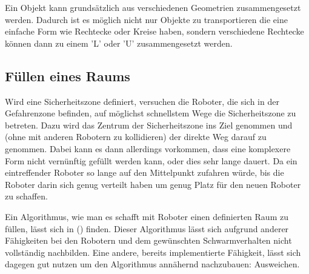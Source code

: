 Ein Objekt kann grundsätzlich aus verschiedenen Geometrien zusammengesetzt werden. Dadurch ist es möglich nicht nur Objekte zu transportieren die eine einfache Form wie Rechtecke oder Kreise haben, sondern verschiedene Rechtecke können dann zu einem 'L' oder 'U' zusammengesetzt werden.

\subsection*{Füllen eines Raums}

Wird eine Sicherheitszone definiert, versuchen die Roboter, die sich in der Gefahrenzone befinden, auf möglichst schnellstem Wege die Sicherheitszone zu betreten. Dazu wird das Zentrum der Sicherheitszone ins Ziel genommen und (ohne mit anderen Robotern zu kollidieren) der direkte Weg darauf zu genommen. Dabei kann es dann allerdings vorkommen, dass eine komplexere Form nicht vernünftig gefüllt werden kann, oder dies sehr lange dauert. Da ein eintreffender Roboter so lange auf den Mittelpunkt zufahren würde, bis die Roboter darin sich genug verteilt haben um genug Platz für den neuen Roboter zu schaffen.

Ein Algorithmus, wie man es schafft mit Roboter einen definierten Raum zu füllen, lässt sich in () finden. Dieser Algorithmus lässt sich aufgrund anderer Fähigkeiten bei den Robotern und dem gewünschten Schwarmverhalten nicht vollständig nachbilden. Eine andere, bereits implementierte Fähigkeit, lässt sich dagegen gut nutzen um den Algorithmus annähernd nachzubauen: Ausweichen.

